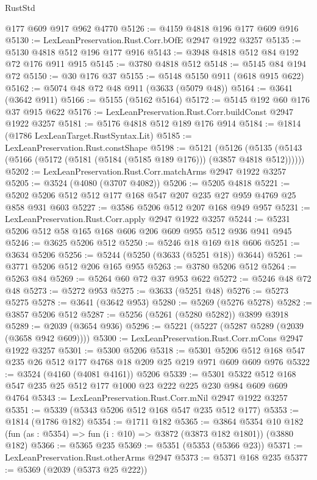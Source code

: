 \begin{lexlean}{RustStd}
\begin{coremodule}
    @177
    @609
    @917
    @962
    @4770
@5126 := @4159 @4818 @196 @177 @609 @916
@5130 := LexLeanPreservation.Rust.Corr.bOfE @2947 @1922 @3257
@5135 := @5130 @4818 @512 @196 @177 @916
@5143 := @3948 @4818 @512 @84 @192 @72 @176 @911 @915
@5145 := @3780 @4818 @512
@5148 := @5145 @84 @194 @72
@5150 := @30 @176 @37
@5155 := @5148 @5150 @911 (@618 @915 @622)
@5162 := @5074 @48 @72 @48 @911 (@3633 (@5079 @48))
@5164 := @3641 (@3642 @911)
@5166 := @5155 (@5162 @5164)
@5172 := @5145 @192 @60 @176 @37 @915 @622
@5176 := LexLeanPreservation.Rust.Corr.buildConst @2947 @1922 @3257
@5181 := @5176 @4818 @512 @189 @176 @914
@5184 := @1814 (@1786 LexLeanTarget.RustSyntax.Lit)
@5185 := LexLeanPreservation.Rust.constShape
@5198 := @5121
    (@5126 (@5135 (@5143 (@5166 (@5172 (@5181 (@5184 (@5185 @189 @176))) (@3857 @4818 @512))))))
@5202 := LexLeanPreservation.Rust.Corr.matchArms @2947 @1922 @3257
@5205 := @3524 (@4080 (@3707 @4082))
@5206 := @5205 @4818
@5221 := @5202 @5206 @512 @512 @177 @168 @547 @207 @235 @27 @959 @4769 @25 @858 @931 @603
@5227 := @3586 @5206 @512 @207 @168 @949 @957
@5231 := LexLeanPreservation.Rust.Corr.apply @2947 @1922 @3257
@5244 := @5231 @5206 @512 @58 @165 @168 @606 @206 @609 @955 @512 @936 @941 @945
@5246 := @3625 @5206 @512
@5250 := @5246 @18 @169 @18 @606
@5251 := @3634 @5206
@5256 := @5244 (@5250 (@3633 (@5251 @18)) @3644)
@5261 := @3771 @5206 @512 @206 @165 @955
@5263 := @3780 @5206 @512
@5264 := @5263 @84
@5269 := @5264 @60 @72 @37 @953 @622
@5272 := @5246 @48 @72 @48
@5273 := @5272 @953
@5275 := @3633 (@5251 @48)
@5276 := @5273 @5275
@5278 := @3641 (@3642 @953)
@5280 := @5269 (@5276 @5278)
@5282 := @3857 @5206 @512
@5287 := @5256 (@5261 (@5280 @5282)) @3899 @3918
@5289 := @2039 (@3654 @936)
@5296 := @5221 (@5227 (@5287 @5289 (@2039 (@3658 @942 @609))))
@5300 := LexLeanPreservation.Rust.Corr.mCons @2947 @1922 @3257
@5301 := @5300 @5206
@5318 := @5301 @5206 @512 @168 @547 @235 @26 @512 @177 @4768 @18 @209 @25 @219 @971 @609 @609 @976
@5322 := @3524 (@4160 (@4081 @4161)) @5206
@5339 := @5301 @5322 @512 @168 @547 @235 @25 @512 @177 @1000 @23 @222 @225 @230 @984 @609 @609 @4764
@5343 := LexLeanPreservation.Rust.Corr.mNil @2947 @1922 @3257
@5351 := @5339 (@5343 @5206 @512 @168 @547 @235 @512 @177)
@5353 := @1814 (@1786 @182)
@5354 := @1711 @182
@5365 := @3864
    @5354
    @10
    @182
    (fun (as : @5354) => fun (i : @10) => @3872 (@3873 @182 @1801))
    (@3880 @182)
@5366 := @5365 @235
@5369 := @5351 (@5353 (@5366 @23))
@5371 := LexLeanPreservation.Rust.otherArms @2947
@5373 := @5371 @168 @235
@5377 := @5369 (@2039 (@5373 @25 @222))

\end{coremodule}
\end{lexlean}
